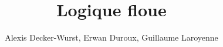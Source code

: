 \documentclass[a4paper,11pt]{article}
\title{Logique floue}
\author{Alexis Decker-Wurst, Erwan Duroux, Guillaume Laroyenne}
\begin{document}
\maketitle
\tableofcontents

\begin{abstract}
\end{abstract}

\section{}
\end{document}
